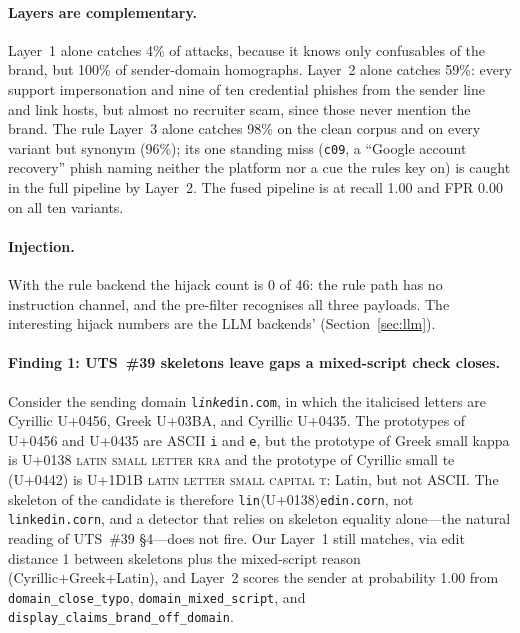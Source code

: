 \documentclass[10pt,twocolumn]{article}
\newcommand{\code}[1]{\texttt{#1}}
\newcommand{\cp}[1]{\mbox{U+#1}}
\begin{document}
\paragraph{Layers are complementary.} Layer~1 alone catches 4\% of attacks, because it knows only confusables of the brand, but 100\% of sender-domain homographs. Layer~2 alone catches 59\%: every support impersonation and nine of ten credential phishes from the sender line and link hosts, but almost no recruiter scam, since those never mention the brand. The rule Layer~3 alone catches 98\% on the clean corpus and on every variant but synonym (96\%); its one standing miss (\code{c09}, a ``Google account recovery'' phish naming neither the platform nor a cue the rules key on) is caught in the full pipeline by Layer~2. The fused pipeline is at recall 1.00 and FPR 0.00 on all ten variants.

\paragraph{Injection.} With the rule backend the hijack count is 0 of 46: the rule path has no instruction channel, and the pre-filter recognises all three payloads. The interesting hijack numbers are the LLM backends' (Section~\ref{sec:llm}).

\paragraph{Finding 1: UTS~\#39 skeletons leave gaps a mixed-script check closes.}
Consider the sending domain \code{l\textit{i}n\textit{k}\textit{e}din.com}, in which the italicised letters are Cyrillic \cp{0456}, Greek \cp{03BA}, and Cyrillic \cp{0435}. The prototypes of \cp{0456} and \cp{0435} are ASCII \code{i} and \code{e}, but the prototype of Greek small kappa is \cp{0138} \textsc{latin small letter kra} and the prototype of Cyrillic small te (\cp{0442}) is \cp{1D1B} \textsc{latin letter small capital t}: Latin, but not ASCII. The skeleton of the candidate is therefore \code{lin}$\langle$\cp{0138}$\rangle$\code{edin.corn}, not \code{linkedin.corn}, and a detector that relies on skeleton equality alone---the natural reading of UTS~\#39 \S4---does not fire. Our Layer~1 still matches, via edit distance 1 between skeletons plus the mixed-script reason (Cyrillic+Greek+Latin), and Layer~2 scores the sender at probability 1.00 from \code{domain\_close\_typo}, \code{domain\_mixed\_script}, and \code{display\_claims\_brand\_off\_domain}.
\end{document}
